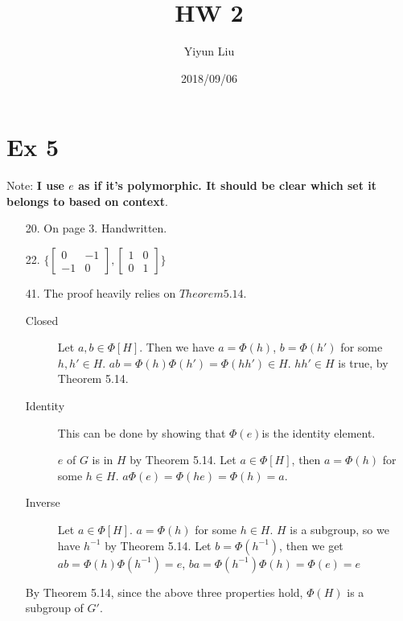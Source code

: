 \documentclass{article}
\title{HW 2}
\date{2018/09/06}
\author{Yiyun Liu}
\begin{document}
\maketitle
\lstset{basicstyle=\ttfamily}

\section*{Ex 5}
Note: \textbf{I use $e$ as if it's polymorphic. It should be clear which set it
belongs to based on context}.
\begin{itemize}
\item [20.]
  On page 3. Handwritten.
\item [22.]
  $\{
  \begin{bmatrix}
    0 & -1 \\
    -1 & 0
  \end{bmatrix},
  \begin{bmatrix}
    1 & 0 \\
    0 & 1
  \end{bmatrix}
\}$
\item [41.]
  The proof heavily relies on $Theorem 5.14$.
  \begin{description}
  \item [Closed]
    Let $a,b \in \Phi[H]$. Then we have $a = \Phi(h)$, $b=\Phi(h')$
    for some $h,h' \in H$. $ab = \Phi(h)\Phi(h')=\Phi(hh') \in
    H$. $hh' \in H$ is true, by Theorem 5.14.
  \item [Identity]
        This can be done by showing that $\Phi(e)$is the identity
        element.

        $e$ of $G$ is in $H$ by Theorem 5.14.
        Let $a \in \Phi[H]$, then $a = \Phi(h)$ for some $h \in H$. $a
        \Phi(e) = \Phi(he) = \Phi(h) = a$.
  \item [Inverse]
    Let $a \in \Phi[H]$. $a=\Phi(h)$ for some $h\in H$. $H$ is a
    subgroup, so we have $h^{-1}$ by Theorem 5.14. Let $b=\Phi(h^{-1})$, then we get $ab
    = \Phi(h)\Phi(h^{-1}) = e$, $ba=\Phi(h^{-1})\Phi(h)=\Phi(e)=e$
  \end{description}
  By Theorem 5.14, since the above three properties hold, $\Phi(H)$ is
  a subgroup of $G'$.
\end{itemize}
\end{document}
